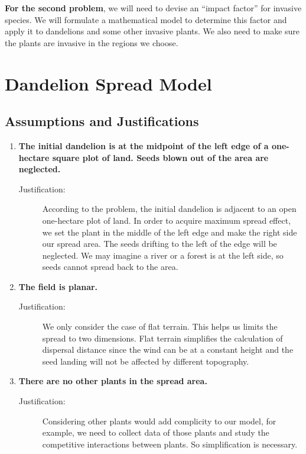 \documentclass[12pt]{article}
\begin{document}
	\textbf{For the second problem}, we will need to devise an ``impact factor'' for invasive species.  We will formulate a mathematical model to determine this factor and apply it to dandelions and some other invasive plants.  We also need to make sure the plants are invasive in the regions we choose.

\section{Dandelion Spread Model}

	\subsection{Assumptions and Justifications}
	
		\begin{enumerate}
			
			\item \textbf{The initial dandelion is at the midpoint of the left edge of a one-hectare square plot of land.  Seeds blown out of the area are neglected.}
			\vspace{-0.125in}
			\begin{description}
				\item[Justification:] According to the problem, the initial dandelion is adjacent to an open one-hectare plot of land. In order to acquire maximum spread effect, we set the plant in the middle of the left edge and make the right side our spread area. The seeds drifting to the left of the edge will be neglected. We may imagine a river or a forest is at the left side, so seeds cannot spread back to the area.
			\end{description}
			
			\item \textbf{The field is planar.}
			\vspace{-0.125in}
			\begin{description}
				\item[Justification:] We only consider the case of flat terrain.  This helps us limits the spread to two dimensions.  Flat terrain simplifies the calculation of dispersal distance since the wind can be at a constant height and the seed landing will not be affected by different topography.
			\end{description}
			
			\item \textbf{There are no other plants in the spread area.}
			\vspace{-0.125in}
			\begin{description}
				\item[Justification:] Considering other plants would add complicity to our model, for example, we need to collect data of those plants and study the competitive interactions between plants.  So simplification is necessary.
				

\end{description}
\end{enumerate}
\end{document}
